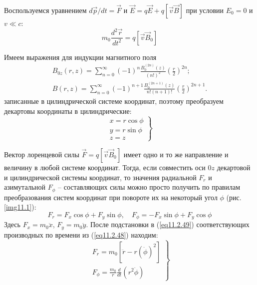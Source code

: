 
Воспользуемся уравнением \( d\vec{p}/dt = \vec{F} \) и 
\( \vec{E} = q\vec{E} + q[\vec{v}\vec{B}] \) при условии \( E_0 = 0 \) и 
\( v \ll c \):
\begin{equation}
	m_0 \frac{d^2 \vec{r}}{dt^2} = q[\vec{v}\vec{B}_0]
	\label{eq11.2.47}
\end{equation}

Имеем выражения для индукции магнитного поля 
\[
	\begin{array}{c}
		B_{0z}(r,z) = \sum\limits_{n=0}^{\infty}(-1)^n 
			\frac{B_0^{(2n)}(z)}{(n!)^2}\left(\frac{r}{2}\right)^{2n}; \\
		B(r,z) = \sum\limits_{n=0}^{\infty}(-1)^{n+1} 
			\frac{B_0^{(2n+1)}(z)}{n!(n+1)!}\left(\frac{r}{2}\right)^{2n+1}.
	\end{array}
\]
записанные в цилиндрической системе координат, поэтому преобразуем декартовы 
координаты в цилиндрические:
\begin{equation}
	\left. \begin{array}{c}
		x = r\cos\phi \\
		y = r\sin\phi \\
		z = z
	\end{array} \right\}
	\label{eq11.2.48}
\end{equation}

Вектор лоренцевой силы \( \vec{F} = q[\vec{v}\vec{B}_0] \) имеет одно и то же 
направление и величину в любой системе координат. Тогда, если совместить оси 
\( 0z \) декартовой и цилиндрической системы координат, то значения радиальной 
\( F_r \) и азимутальной \( F_\phi \) -- составляющих силы можно просто 
получить по правилам преобразования систем координат при повороте их на 
некоторый угол \( \phi \) (рис.\ref{img11.1}):
\begin{equation}
	F_r = F_x \cos\phi + F_y \sin\phi, \quad
	F_\phi = -F_x \sin\phi + F_y \cos\phi
	\label{eq11.2.49}
\end{equation}
Здесь \( F_x = m_0 \ddot{x} \), \( F_y = m_0 \ddot{y} \). После подстановки в 
(\ref{eq11.2.49})  соответствующих производных по времени из 
(\ref{eq11.2.48}) находим:
\begin{equation}
	\left. \begin{array}{c}
		F_r = m_0 \left[ \ddot{r} - r(\dot{\phi})^2 \right] \\
		F_\phi = \frac{m_0}{r}\frac{d}{dt}\left( r^2\dot{\phi} \right)
	\end{array} \right\}
	\label{eq11.2.50}
\end{equation}

